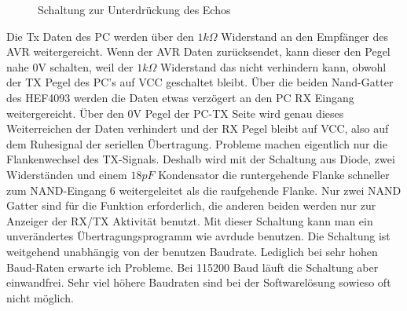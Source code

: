 \begin{figure}[H]
\centering
{}
\caption{Schaltung zur Unterdrückung des Echos}
\label{fig:onewire}
\end{figure}

Die Tx Daten des PC werden über den \(1k \Omega\) Widerstand an den Empfänger des AVR weitergereicht.
Wenn der AVR Daten zurücksendet, kann dieser den Pegel nahe 0V schalten, weil der \(1k \Omega\) Widerstand
das nicht verhindern kann, obwohl der TX Pegel des PC's auf VCC geschaltet bleibt. Über die beiden
Nand-Gatter des HEF4093 werden die Daten etwas verzögert an den PC RX Eingang weitergereicht.
Über den 0V Pegel der PC-TX Seite wird genau dieses Weiterreichen der Daten verhindert und der
RX Pegel bleibt auf VCC, also auf dem Ruhesignal der seriellen Übertragung.
Probleme machen eigentlich nur die Flankenwechsel des TX-Signals. Deshalb wird mit der
Schaltung aus Diode, zwei Widerständen und einem \(18 pF\) Kondensator die runtergehende Flanke
schneller zum NAND-Eingang 6 weitergeleitet als die raufgehende Flanke.
Nur zwei NAND Gatter sind für die Funktion erforderlich, die anderen beiden werden nur
zur Anzeiger der RX/TX Aktivität benutzt.
Mit dieser Schaltung kann man ein unverändertes Übertragungsprogramm wie avrdude benutzen.
Die Schaltung ist weitgehend unabhängig von der benutzen Baudrate.
Lediglich bei sehr hohen Baud-Raten erwarte ich Probleme. Bei 115200 Baud läuft die Schaltung
aber einwandfrei. Sehr viel höhere Baudraten sind bei der Softwarelösung sowieso
oft nicht möglich.

